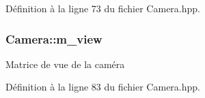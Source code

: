 Définition à la ligne 73 du fichier Camera.\+hpp.

\hypertarget{classCamera_ad86d990f179df0cd5560bca660d5ffbf}{
\subsubsection[{m\+\_\+view}]{\setlength{\rightskip}{0pt plus 5cm}Camera\+::m\+\_\+view}}\label{classCamera_ad86d990f179df0cd5560bca660d5ffbf}
{\ttfamily Matrice} de vue de la caméra 

Définition à la ligne 83 du fichier Camera.\+hpp.


